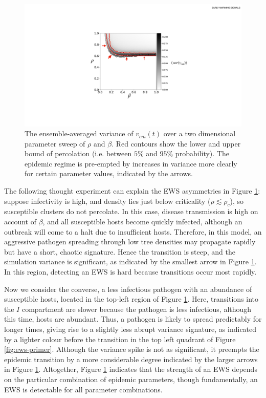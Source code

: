  \begin{figure}
    \centering
    \includegraphics[scale=0.45]{chapter3/figures/figure11.pdf}
    \caption{The ensemble-averaged variance of $v_{cm}(t)$ over a two dimensional parameter sweep of $\rho$ and $\beta$. Red contours show the lower and upper bound of percolation (i.e. between $5\%$ and $95\%$ probability). 
     The epidemic regime is pre-empted by increases in variance more clearly for certain parameter values, %
     indicated by the arrows.}
    \label{fig:ews-results} 
\end{figure}

The following thought experiment can explain the EWS asymmetries in Figure \ref{fig:ews-results}: %
suppose infectivity is high, and density lies just below criticality ($\rho\lesssim\rho_c$), 
so susceptible clusters do not percolate. 
In this case, disease transmission is high on account of $\beta$, 
and all susceptible hosts become quickly infected, 
although an outbreak will come to a halt due to insufficient hosts. Therefore, in this model, 
an aggressive pathogen spreading through low tree densities may propagate rapidly but have a short, 
chaotic signature. Hence the transition is steep,
and the simulation variance is significant, as indicated by the smallest arrow in Figure \ref{fig:ews-results}. 
In this region, detecting an EWS is hard because transitions occur most rapidly.

Now we consider the converse, a less infectious pathogen with an abundance of susceptible hosts, 
located in the top-left region of Figure \ref{fig:ews-results}.
Here, transitions into the $I$ compartment are slower because the pathogen is less infectious, 
although this time, hosts are abundant.
Thus, a pathogen is likely to spread predictably for longer times, 
giving rise to a slightly less abrupt variance signature, 
as indicated by a lighter colour before the transition in the top left quadrant of Figure \ref{fig:ews-primer}.
Although the variance spike is not as significant, 
it preempts the epidemic transition by a more considerable degree\textemdash
indicated by the larger arrows in Figure \ref{fig:ews-results}.
Altogether, Figure \ref{fig:ews-results} indicates that the strength of an EWS depends on the particular combination of epidemic parameters, 
though fundamentally, an EWS is detectable for all parameter combinations.

